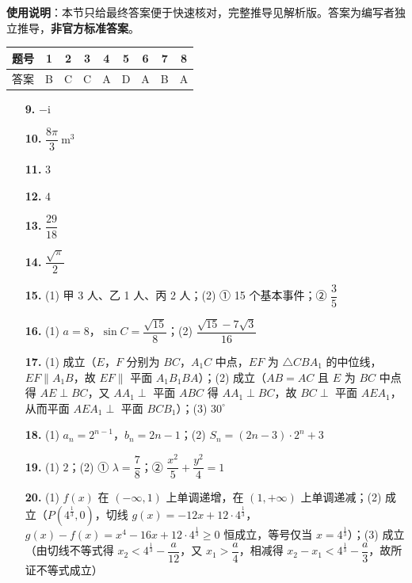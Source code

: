 
\begin{gknotice}
\textbf{使用说明}：本节只给最终答案便于快速核对，完整推导见解析版。答案为编写者独立推导，\textbf{非官方标准答案}。
\end{gknotice}

\begin{center}\begin{tabular}{ccccccccc}
\toprule
题号 & 1 & 2 & 3 & 4 & 5 & 6 & 7 & 8 \\
\midrule
答案 & B & C & C & A & D & A & B & A \\
\bottomrule
\end{tabular}\end{center}

\begin{itemize}[leftmargin=2.6em]
  \item[\textbf{9.}] \(-\mathrm{i}\)
  \item[\textbf{10.}] \(\dfrac{8\pi}{3}\ \mathrm{m}^3\)
  \item[\textbf{11.}] \(3\)
  \item[\textbf{12.}] \(4\)
  \item[\textbf{13.}] \(\dfrac{29}{18}\)
  \item[\textbf{14.}] \(\dfrac{\sqrt{\pi}}{2}\)
\end{itemize}

\begin{itemize}[leftmargin=2.6em]
  \item[\textbf{15.}] (1) 甲 3 人、乙 1 人、丙 2 人；(2) ① 15 个基本事件；② \(\dfrac{3}{5}\)
  \item[\textbf{16.}] (1) \(a=8\)，\(\sin C=\dfrac{\sqrt{15}}{8}\)；(2) \(\dfrac{\sqrt{15}-7\sqrt{3}}{16}\)
  \item[\textbf{17.}] (1) 成立（\(E\)，\(F\) 分别为 \(BC\)，\(A_1C\) 中点，\(EF\) 为 \(\triangle CBA_1\) 的中位线，\(EF\parallel A_1B\)，故 \(EF\parallel\) 平面 \(A_1B_1BA\)）；(2) 成立（\(AB=AC\) 且 \(E\) 为 \(BC\) 中点得 \(AE\perp BC\)，又 \(AA_1\perp\) 平面 \(ABC\) 得 \(AA_1\perp BC\)，故 \(BC\perp\) 平面 \(AEA_1\)，从而平面 \(AEA_1\perp\) 平面 \(BCB_1\)）；(3) \(30^{\circ}\)
  \item[\textbf{18.}] (1) \(a_n=2^{n-1}\)，\(b_n=2n-1\)；(2) \(S_n=(2n-3)\cdot2^{n}+3\)
  \item[\textbf{19.}] (1) \(2\)；(2) ① \(\lambda=\dfrac{7}{8}\)；② \(\dfrac{x^2}{5}+\dfrac{y^2}{4}=1\)
  \item[\textbf{20.}] (1) \(f(x)\) 在 \((-\infty,1)\) 上单调递增，在 \((1,+\infty)\) 上单调递减；(2) 成立（\(P(4^{\frac{1}{3}},0)\)，切线 \(g(x)=-12x+12\cdot4^{\frac{1}{3}}\)，\(g(x)-f(x)=x^4-16x+12\cdot4^{\frac{1}{3}}\geqslant0\) 恒成立，等号仅当 \(x=4^{\frac{1}{3}}\)）；(3) 成立（由切线不等式得 \(x_2<4^{\frac{1}{3}}-\dfrac{a}{12}\)，又 \(x_1>\dfrac{a}{4}\)，相减得 \(x_2-x_1<4^{\frac{1}{3}}-\dfrac{a}{3}\)，故所证不等式成立）
\end{itemize}
